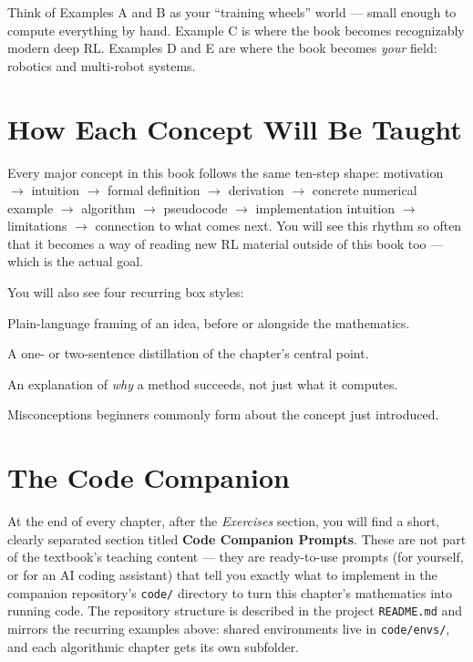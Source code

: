 \begin{intuitionbox}
Think of Examples A and B as your ``training wheels'' world — small enough
to compute everything by hand. Example C is where the book becomes
recognizably modern deep RL. Examples D and E are where the book becomes
\emph{your} field: robotics and multi-robot systems.
\end{intuitionbox}

\section{How Each Concept Will Be Taught}

Every major concept in this book follows the same ten-step shape:
motivation $\to$ intuition $\to$ formal definition $\to$ derivation $\to$
concrete numerical example $\to$ algorithm $\to$ pseudocode $\to$
implementation intuition $\to$ limitations $\to$ connection to what comes
next. You will see this rhythm so often that it becomes a way of reading
new RL material outside of this book too — which is the actual goal.

You will also see four recurring box styles:

\begin{intuitionbox}
Plain-language framing of an idea, before or alongside the mathematics.
\end{intuitionbox}

\begin{keyidea}
A one- or two-sentence distillation of the chapter's central point.
\end{keyidea}

\begin{whythisworks}
An explanation of \emph{why} a method succeeds, not just what it computes.
\end{whythisworks}

\begin{commonmistakes}
Misconceptions beginners commonly form about the concept just introduced.
\end{commonmistakes}

\section{The Code Companion}

At the end of every chapter, after the \emph{Exercises} section, you will
find a short, clearly separated section titled \textbf{Code Companion
Prompts}. These are not part of the textbook's teaching content — they are
ready-to-use prompts (for yourself, or for an AI coding assistant) that
tell you exactly what to implement in the companion repository's
\texttt{code/} directory to turn this chapter's mathematics into running
code. The repository structure is described in the project \texttt{README.md}
and mirrors the recurring examples above: shared environments live in
\texttt{code/envs/}, and each algorithmic chapter gets its own subfolder.

